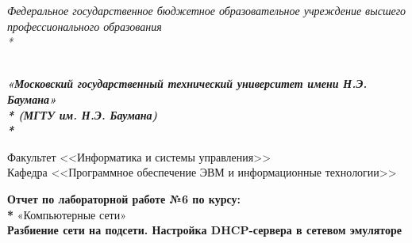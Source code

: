 \newpage
\begin{titlepage}
	\thispagestyle{empty}
	
	{\large
		\begin{center}
			\textsl{Федеральное государственное бюджетное образовательное учреждение высшего профессионального образования \\* }	
			\vspace{2em}
		\end{center}
	}
	{
		\begin{minipage}[t]{0.13\textwidth}
			\centering{}
			\label{fig0}
		\end{minipage}\hfill
		\begin{minipage}[t]{0.65\textwidth}
			\begin{center}
				\large  \textsl{\textbf {\\ «Московский государственный технический университет имени Н.Э. Баумана» \\* (МГТУ им. Н.Э. Баумана) \\* }}
			\end{center}
		\end{minipage}
	}
	
	\vspace{2em}
	
	\hrulefill
	
	\begin{center}
		\vspace{0pt plus2fill} %
		{\large
			Факультет  <<Информатика и системы управления>>\\
			Кафедра  <<Программное обеспечение ЭВМ и информационные технологии>>
		}
	\end{center}
	
	{\Large
		\begin{center}
			\textbf{Отчет по лабораторной работе №6 по курсу: \\* } «Компьютерные сети» \\
			\textbf{Разбиение сети на подсети. Настройка DHCP-сервера в сетевом эмуляторе}\\
		\end{center}
	}
	\vspace{0pt plus4fill} %
	

\end{titlepage}
